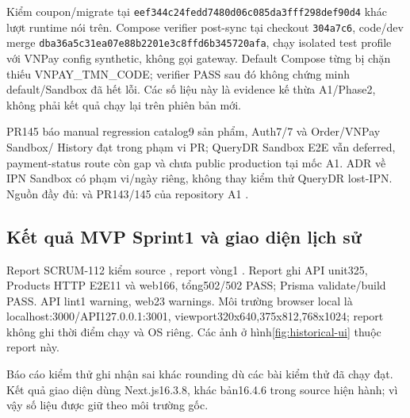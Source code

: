 Kiểm coupon/migrate tại \texttt{eef344c24fedd7480d06c085da3fff298def90d4}
khác lượt runtime nói trên. Compose verifier post-sync tại checkout
\texttt{304a7c6}, code/dev merge \texttt{dba36a5c31ea07e88b2201e3c8ffd6b345720afa},
chạy isolated test profile với VNPay config synthetic, không gọi gateway.
Default Compose từng bị chặn thiếu VNPAY\_TMN\_CODE; verifier PASS sau đó
không chứng minh default/Sandbox đã hết lỗi. Các số liệu này là evidence
kế thừa A1/Phase2, không phải kết quả chạy lại trên phiên bản mới.

PR145 báo manual regression catalog9 sản phẩm, Auth7/7 và Order/VNPay Sandbox/
History đạt trong phạm vi PR; QueryDR Sandbox E2E vẫn deferred, payment-status
route còn gap và chưa public production tại mốc A1. ADR về IPN Sandbox có
phạm vi/ngày riêng, không thay kiểm thử QueryDR lost-IPN.
Nguồn đầy đủ: 
và PR143/145 của repository A1 \cite{a1repo}.

\subsection{Kết quả MVP Sprint1 và giao diện lịch sử}
Report SCRUM-112 kiểm source
, report vòng1
.
Report ghi API unit325, Products HTTP E2E11 và web166, tổng502/502 PASS;
Prisma validate/build PASS. API lint1 warning, web23 warnings.
Môi trường browser local là localhost:3000/API127.0.0.1:3001,
viewport320x640,375x812,768x1024; report không ghi thời điểm chạy và OS riêng.
Các ảnh ở hình\ref{fig:historical-ui} thuộc report này.

Báo cáo kiểm thử ghi nhận sai khác rounding dù các bài kiểm thử đã chạy đạt. Kết quả giao diện dùng Next.js16.3.8, khác bản16.4.6 trong source hiện hành; vì vậy số liệu được giữ theo môi trường gốc.

